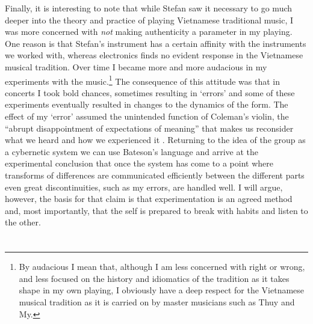 \documentclass[a4paper]{article}
\begin{document}
Finally, it is interesting to note that while Stefan saw it necessary to go much deeper into the theory and practice of playing Vietnamese traditional music, I was more concerned with \emph{not} making authenticity a parameter in my playing. One reason is that Stefan's instrument has a certain affinity with the instruments we worked with, whereas electronics finds no evident response in the Vietnamese musical tradition. Over time I became more and more audacious in my experiments with the music.\footnote{By audacious I mean that, although I am less concerned with right or wrong, and less focused on the history and idiomatics of the tradition as it takes shape in my own playing, I obviously have a deep respect for the Vietnamese musical tradition as it is carried on by master musicians such as Thuy and My.} The consequence of this attitude was that in concerts I took bold chances, sometimes resulting in `errors' and some of these experiments eventually resulted in changes to the dynamics of the form. The effect of my `error' assumed the unintended function of Coleman's violin, the ``abrupt disappointment of expectations of meaning'' that makes us reconsider what we heard and how we experienced it \citep{barthes68:death_of}. Returning to the idea of the group as a cybernetic system we can use Bateson's language and arrive at the experimental conclusion that once the system has come to a point where transforms of differences are communicated efficiently between the different parts even great discontinuities, such as my errors, are handled well. I will argue, however, the basis for that claim is that experimentation is an agreed method and, most importantly, that the self is prepared to break with habits and listen to the other.


\section*{ }
\label{sec:discussion}
\end{document}
